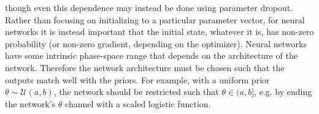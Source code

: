 \documentclass[twocolumn]{aastex631}
\newcommand{\mcal}[1]{\mathcal{#1}}
\begin{document}
    though even this dependence may instead be done using parameter
    dropout. Rather than focusing on initializing to a particular
    parameter vector, for neural networks it is instead important that
    the initial state, whatever it is, has non-zero probability (or
    non-zero gradient, depending on the optimizer).  Neural networks
    have some intrinsic phase-space range that depends on the
    architecture of the network. Therefore the network architecture must
    be chosen such that the outputs match well with the priors. For
    example, with a uniform prior $\theta \sim \mcal{U}(a,b)$, the
    network should be restricted such that $\theta \in (a, b]$, e.g. by
    ending the network's $\theta$ channel with a scaled logistic
    function.
\end{document}
